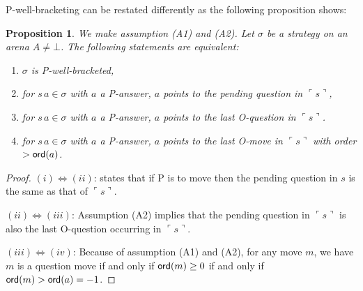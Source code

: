 \documentclass{article}
\newcommand{\pview}[1]{\ulcorner #1 \urcorner}
\newcommand{\ord}[1]{{\sf ord}(#1)}
\newtheorem{proposition}{Proposition}[section]
\theoremstyle{remark}
\theoremstyle{definition}
\begin{document}
P-well-bracketing can be restated differently as the following proposition shows:
\begin{proposition}
\label{prop:char_wellbrack}
\rm We make assumption (A1) and (A2).
Let $\sigma$ be a strategy on an arena $A\neq \bot$.
The following statements are equivalent:
\begin{enumerate}
\item[(i)] $\sigma$ is P-well-bracketed,
\item[(ii)] for $s \, a \in \sigma$ with $a$ a P-answer, $a$ points to the pending question in $\pview{s}$,
\item[(iii)] for $s \, a \in \sigma$ with $a$ a P-answer, $a$ points to the last O-question in $\pview{s}$.
\item[(iv)] for $s \, a \in \sigma$ with $a$ a P-answer, $a$ points to the last O-move in $\pview{s}$ with order $>\ord{a}$.
\end{enumerate}
\end{proposition}
\begin{proof}
$(i)\iff(ii)$: \cite[Lemma 2.1]{McC96b} states that if P is to move then the pending question in $s$ is the same as that of $\pview{s}$.

$(ii)\iff(iii)$: Assumption (A2) implies that the pending question in $\pview{s}$ is also the last O-question occurring in $\pview{s}$.

$(iii)\iff(iv)$: Because of assumption (A1) and (A2),
for any move $m$, we have $m$ is a question move 
if and only if $\ord{m} \geq 0$ if and only if $\ord{m} > \ord{a} = -1$.
\end{proof}
\end{document}

